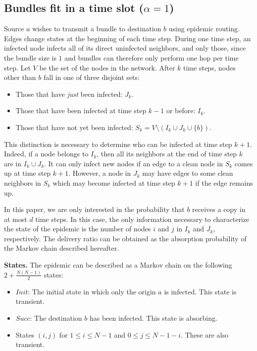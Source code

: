 \documentclass[final,journal,letterpaper]{IEEEtran}
\begin{document}
\subsection{Bundles fit in a time slot \texorpdfstring{($\alpha = 1$)}{}}
\label{subsec:epi_model}

Source $a$ wishes to transmit a bundle to destination $b$ using epidemic routing. Edges change states at the beginning of each time step. During one time step, an infected node infects all of its direct uninfected neighbors, and only those, since the bundle size is $1$ and bundles can therefore only perform one hop per time step. Let $V$ be the set of the nodes in the network. After $k$ time steps, nodes other than $b$ fall in one of three disjoint sets:

\begin{itemize}
   \item Those that have \emph{just} been infected: $J_k$.
   \item Those that have been infected at time step $k-1$ or before: $I_{k}$.
   \item Those that have not yet been infected: $S_k = V \setminus (I_k \cup J_k \cup \{b\})$.
\end{itemize}

This distinction is necessary to determine who can be infected at time step $k+1$. Indeed, if a node belongs to $I_k$, then all its neighbors at the end of time step $k$ are in $I_k \cup J_k$. It can only infect new nodes if an edge to a clean node in $S_k$ comes up at time step $k+1$. However, a node in $J_k$ may have edges to some clean neighbors in $S_k$ which may become infected at time step $k+1$ if the edge remains up.

In this paper, we are only interested in the probability that $b$ receives a copy in at most $d$ time steps. In this case, the only information necessary to characterize the state of the epidemic is the number of nodes $i$ and $j$ in $I_k$ and $J_k$, respectively. The delivery ratio can be obtained as the absorption probability of the Markov chain described hereafter.

\noindent\textbf{States.} The epidemic can be described as a Markov chain on the following $2+\frac{N(N-1)}{2}$ states:

\begin{itemize}
   \item $Init$: The initial state in which only the origin $a$ is
     infected. This state is transient.
   \item $Succ$: The destination $b$ has been infected. This state is absorbing.
   \item States $(i,j)$ for $1 \le i \le N-1$ and $0 \le j \le   N-1-i$. These are also transient.
\end{itemize}
\end{document}
